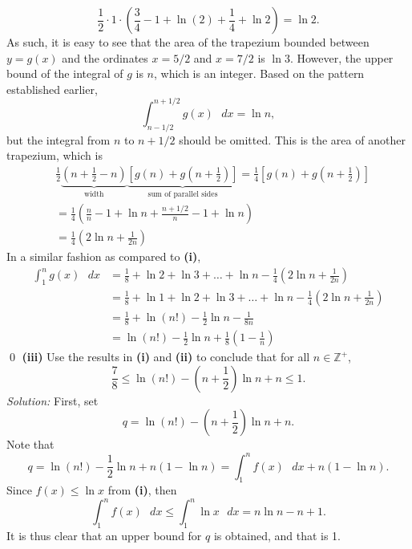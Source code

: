 \documentclass{article}
\begin{document}
\[\frac{1}{2}\cdot 1 \cdot \left(\frac{3}{4}-1+\ln\left(2\right)+\frac{1}{4}+\ln2 \right )=\operatorname{ln}2.\]
As such, it is easy to see that the area of the trapezium bounded between $y=g(x)$ and the ordinates $x=5/2$ and $x=7/2$ is $\operatorname{ln}3$.
\newline
\newline However,  the upper bound of the integral of $g$ is $n$, which is an integer. Based on the pattern established earlier, \[\int_{n-1/2}^{n+1/2}g(x)\text{ }dx=\operatorname{ln}n,\] but the integral from $n$ to $n+1/2$ should be omitted. This is the area of another trapezium, which is \begin{align*}
  & \frac{1}{2}\underbrace{\left( n+\frac{1}{2}-n \right)}_{\text{width}}\underbrace{\left[ g\left( n \right)+g\left( n+\frac{1}{2} \right) \right]}_{\text{sum of parallel sides}}=\frac{1}{4}\left[ g\left( n \right)+g\left( n+\frac{1}{2} \right) \right] \\ 
 & =\frac{1}{4}\left( \frac{n}{n}-1+\ln n+\frac{n+1/2}{n}-1+\ln n \right) \\ 
 & =\frac{1}{4}\left( 2\ln n+\frac{1}{2n} \right)  
\end{align*}
In a similar fashion as compared to \textbf{(i)}, \begin{align*}
    \int_{1}^{n}g(x)\text{ }dx&=\frac{1}{8}+\operatorname{ln}2+\operatorname{ln}3+\hdots+\operatorname{ln}n-\frac{1}{4}\left(2\operatorname{ln}n+ \frac{1}{2n}\right)\\
    &=\frac{1}{8}+\operatorname{ln}1+\operatorname{ln}2+\operatorname{ln}3+\hdots+\operatorname{ln}n-\frac{1}{4}\left(2\operatorname{ln}n+ \frac{1}{2n}\right)\\
    &=\frac{1}{8}+\operatorname{ln}(n!)-\frac{1}{2}\operatorname{ln}n-\frac{1}{8n}\\
    &=\operatorname{ln}(n!)-\frac{1}{2}\operatorname{ln}n+\frac{1}{8}\left(1-\frac{1}{n}\right)
\end{align*}\qed
\newline
\newline
\textbf{(iii)} Use the results in \textbf{(i)} and \textbf{(ii)} to conclude that for all $n\in\mathbb{Z}^+$, \[\frac{7}{8}\le \operatorname{ln}(n!) -\left(n+\frac{1}{2}\right)\operatorname{ln}n+n\le 1.\]
\textit{Solution:} First, set \[q=\operatorname{ln}(n!) -\left(n+\frac{1}{2}\right)\operatorname{ln}n+n.\]
Note that \[q=\ln (n!)-\frac{1}{2}\ln n+n\left( 1-\ln n \right)=\int_{1}^{n}{f\left( x \right)\text{ }dx}+n\left( 1-\ln n \right).\] Since $f(x) \le \operatorname{ln}x$ from \textbf{(i)}, then \[\int_{1}^{n}f(x)\text{ }dx \le \int_{1}^{n}\operatorname{ln}x\text{ }dx=n\operatorname{ln}n-n+1.\] It is thus clear that an upper bound for $q$ is obtained, and that is 1.
\end{document}
